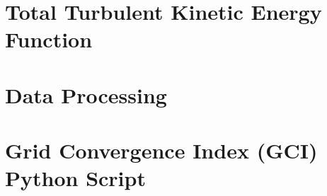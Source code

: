 \documentclass[a4paper,12pt]{report}
\begin{document}
\maketitle
\newpage








\tableofcontents
\listoffigures
\listoftables









\printbibliography[heading=bibintoc, title={References}]

\begin{appendices}
\chapter{Total Turbulent Kinetic Energy Function}
\label{chap:appendixA}


\chapter{Data Processing}
\label{chap:appendixB}


\chapter{Grid Convergence Index (GCI) Python Script}
\label{chap:appendixC}


\end{appendices}
\end{document}
